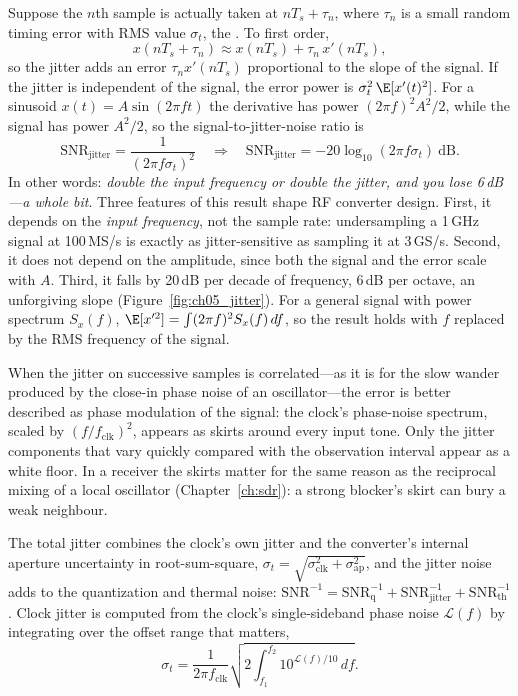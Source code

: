 Suppose the $n$th sample is actually taken at $nT_s+\tau_n$, where $\tau_n$ is a small random
timing error with RMS value $\sigma_t$, the . To first order,
\begin{equation}
x(nT_s+\tau_n)\approx x(nT_s)+\tau_n\,x'(nT_s),
\end{equation}
so the jitter adds an error $\tau_nx'(nT_s)$ proportional to the slope of the signal. If the
jitter is independent of the signal, the error power is $\sigma_t^2\,\E[x'(t)^2]$. For a
sinusoid $x(t)=A\sin(2\pi ft)$ the derivative has power $(2\pi f)^2A^2/2$, while the signal
has power $A^2/2$, so the signal-to-jitter-noise ratio is
\begin{equation}
\text{SNR}_{\text{jitter}}=\frac{1}{(2\pi f\sigma_t)^2}
\quad\Longrightarrow\quad
\text{SNR}_{\text{jitter}}=-20\log_{10}(2\pi f\sigma_t)\ \text{dB}.
\label{eq:ch05:jitter}
\end{equation}
In other words: \emph{double the input frequency or double the jitter, and you lose 6\,dB---a whole
bit}. Three features of this result shape RF converter design. First, it depends on the
\emph{input frequency}, not the sample rate: undersampling a 1\,GHz signal at 100\,MS/s is
exactly as jitter-sensitive as sampling it at 3\,GS/s. Second, it does not depend on the
amplitude, since both the signal and the error scale with $A$. Third, it falls by 20\,dB per
decade of frequency, 6\,dB per octave, an unforgiving slope (Figure~\ref{fig:ch05_jitter}). For a
general signal with power spectrum $S_x(f)$, $\E[x'^2]=\int(2\pi f)^2S_x(f)\,df$, so the result
holds with $f$ replaced by the RMS frequency of the signal.

When the jitter on successive samples is correlated---as it is for the slow wander produced by
the close-in phase noise of an oscillator---the error is better described as phase modulation
of the signal: the clock's phase-noise spectrum, scaled by $(f/f_{\text{clk}})^2$, appears as
skirts around every input tone. Only the jitter components that vary quickly compared with
the observation interval appear as a white floor. In a receiver the skirts matter for the
same reason as the reciprocal mixing of a local oscillator (Chapter~\ref{ch:sdr}): a strong
blocker's skirt can bury a weak neighbour.

The total jitter combines the clock's own jitter and the converter's internal aperture
uncertainty in root-sum-square, $\sigma_t=\sqrt{\sigma_{\text{clk}}^2+\sigma_{\text{ap}}^2}$, and the
jitter noise adds to the quantization and thermal noise:
$\text{SNR}^{-1}=\text{SNR}_{\text{q}}^{-1}+\text{SNR}_{\text{jitter}}^{-1}+\text{SNR}_{\text{th}}^{-1}$.
Clock jitter is computed from the clock's single-sideband phase noise $\mathcal{L}(f)$ by
integrating over the offset range that matters,
\begin{equation}
\sigma_t=\frac{1}{2\pi f_{\text{clk}}}\sqrt{2\int_{f_1}^{f_2}10^{\mathcal{L}(f)/10}\,df}.
\label{eq:ch05:pnjitter}
\end{equation}

